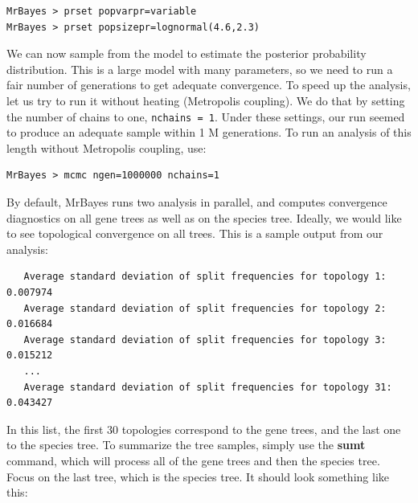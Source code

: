 \documentclass[12pt]{book}
\begin{document}
\begin{singlespacing}
\begin{verbatim}
MrBayes > prset popvarpr=variable
MrBayes > prset popsizepr=lognormal(4.6,2.3)
\end{verbatim}
\end{singlespacing}

We can now sample from the model to estimate the posterior probability distribution. This is a large
model with many parameters, so we need to run a fair number of generations to get adequate
convergence. To speed up the analysis, let us try to run it without heating (Metropolis coupling).
We do that by setting the number of chains to one, \texttt{nchains = 1}. Under these settings,
our run seemed to produce an adequate sample within 1 M generations. To run an analysis
of this length without Metropolis coupling, use:

\begin{verbatim}
MrBayes > mcmc ngen=1000000 nchains=1
\end{verbatim}

By default, MrBayes runs two analysis in parallel, and computes convergence diagnostics on all
gene trees as well as on the species tree. Ideally, we would like to see topological convergence
on all trees. This is a sample output from our analysis:

\footnotesize
\begin{singlespacing}
\begin{verbatim}
   Average standard deviation of split frequencies for topology 1: 0.007974
   Average standard deviation of split frequencies for topology 2: 0.016684
   Average standard deviation of split frequencies for topology 3: 0.015212
   ...
   Average standard deviation of split frequencies for topology 31: 0.043427
\end{verbatim}
\end{singlespacing}
\normalsize

In this list, the first 30 topologies correspond to the gene trees, and the last one to the species tree.
To summarize the tree samples, simply use the \textbf{sumt} command, which will process all of the
gene trees and then the species tree. Focus on the last tree, which is the species tree. It should look
something like this:
\end{document}
